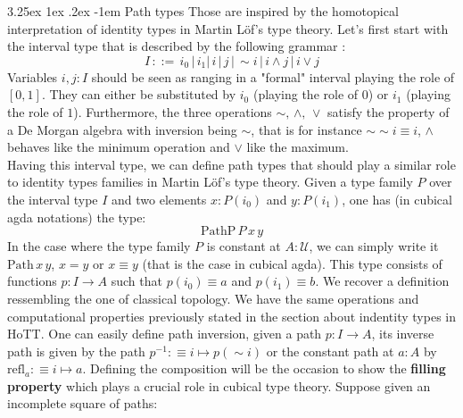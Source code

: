 \documentclass{report}
\makeatletter
\renewcommand\paragraph{\@startsection{paragraph}{5}{\z@}%
  {3.25ex \@plus1ex \@minus.2ex}%
  {-1em}%
  {\normalfont\normalsize\bfseries}}
\makeatother
\begin{document}
\paragraph{Path types} Those are inspired by the homotopical interpretation of identity types in Martin Löf's type theory. Let's first start with the interval type that is described by the following grammar : 
$$I \hspace{2pt} ::= \hspace{2pt} i_0 \hspace{2pt} \vert \hspace{2pt}i_1 \vert \hspace{2pt}  i \hspace{2pt} \vert \hspace{2pt}  j \hspace{2pt} \vert \hspace{2pt} \sim i \hspace{2pt} \vert \hspace{2pt} i \land j \hspace{2pt}\vert \hspace{2pt} i \lor j$$
Variables $i,j : I$ should be seen as ranging in a "formal" interval playing the role of $[0,1]$. They can either be substituted by $i_0$ (playing the role of $0$) or $i_1$ (playing the role of $1$). Furthermore, the three operations $\sim, \hspace{2pt} \land, \hspace{2pt} \lor$ satisfy the property of a De Morgan algebra with inversion being $\sim$, that is for instance $\sim \sim i \equiv i$, $\land$ behaves like the minimum operation and $\lor$ like the maximum.\\
Having this interval type, we can define path types that should play a similar role to identity types families in Martin Löf's type theory. Given a type family $P$ over the interval type $I$ and two elements $x : P(i_0)$ and $y : P(i_1)$, one has (in cubical agda notations) the type: 
$$\mathrm{PathP} \hspace{2pt} P \hspace{2pt} x \hspace{2pt} y$$
In the case where the type family $P$ is constant at $A : \mathcal{U}$, we can simply write it $\mathrm{Path} \hspace{2pt} x \hspace{2pt} y$, $x=y$ or $x \equiv y$ (that is the case in cubical agda). This type consists of functions $p : I \rightarrow A$ such that $p(i_0)\equiv a$ and $p(i_1) \equiv b$. We recover a definition ressembling the one of classical topology. We have the same operations and computational properties previously stated in the section about indentity types in HoTT. One can easily define path inversion, given a path $p : I \rightarrow A$, its inverse path is given by the path $p^{-1} :\equiv i \mapsto p( \sim i)$ or the constant path at $a : A$ by $ \mathrm{refl}_a :\equiv i \mapsto a$. Defining the composition will be the occasion to show the \textbf{filling property} which plays a crucial role in cubical type theory. Suppose given an incomplete square of paths:
\end{document}
